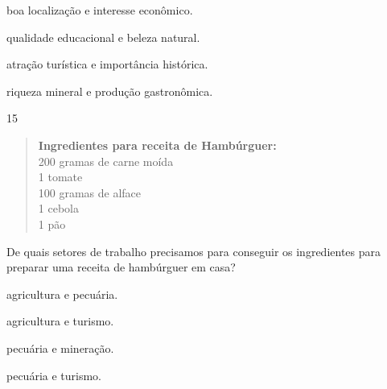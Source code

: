 \begin{escolha}
\item boa localização e interesse econômico.

\item qualidade educacional e beleza natural.

\item atração turística e importância histórica.

\item riqueza mineral e produção gastronômica.
\end{escolha}



\num{15}

\begin{quote}
\textbf{Ingredientes para receita de Hambúrguer:}\\
200 gramas de carne moída\\
1 tomate\\
100 gramas de alface\\
1 cebola\\
1 pão
\end{quote}

\noindent{}De quais setores de trabalho precisamos para conseguir os ingredientes
para preparar uma receita de hambúrguer em casa?

\begin{escolha}
\item agricultura e pecuária.

\item agricultura e turismo.

\item pecuária e mineração.

\item pecuária e turismo.
\end{escolha}


\pagebreak